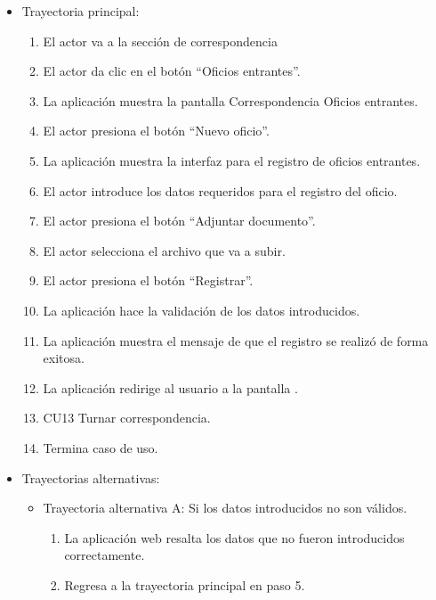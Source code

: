 \begin{itemize}
	\item Trayectoria principal:
	\begin{enumerate}
		\item	El actor va a la sección de correspondencia 
\item	El actor da clic en el botón “Oficios entrantes”.
\item	La aplicación muestra la pantalla  Correspondencia Oficios entrantes.
\item	El actor presiona el botón “Nuevo oficio”.
\item	La aplicación muestra la interfaz  para el registro de oficios entrantes.
\item	El actor introduce los datos requeridos para el registro del oficio.
\item	El actor presiona el botón “Adjuntar documento”.
\item	El actor selecciona el archivo que va a subir.
\item	El actor presiona el botón “Registrar”.
\item	La aplicación hace la validación de los datos introducidos.
\item	La aplicación muestra el mensaje  de que el registro se realizó de forma exitosa.
\item	La aplicación redirige al usuario a la pantalla .
\item	CU13 Turnar correspondencia.
\item	Termina caso de uso.

	\end{enumerate}
	
	\item Trayectorias alternativas:
	\begin{itemize}
		\item Trayectoria alternativa A: Si los datos introducidos no son válidos.
			\begin{enumerate}
				\item La aplicación web resalta los datos que no fueron introducidos correctamente. 
				\item Regresa a la trayectoria principal en paso 5.
			\end{enumerate}
	\end{itemize}
\end{itemize}
\newpage
